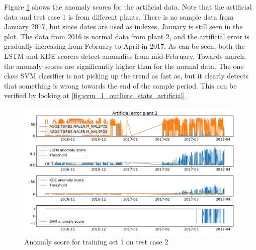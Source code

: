         Figure \ref{fig:anomaly_plant_1_train_artificial} shows the anomaly scores for the artificial data. Note that the artificial data and test case 1 is from different plants. There is no sample data from January 2017, but since dates are used as indexes, January is still seen in the plot. The data from 2016 is normal data from plant 2, and the artificial error is gradually increasing from February to April in 2017. As can be seen, both the LSTM and KDE scorers detect anomalies from mid-February. Towards march, the anomaly scores are significantly higher than for the normal data. The one class SVM classifier is not picking up the trend as fast as, but it clearly detects that something is wrong towards the end of the sample period. This can be verified by looking at \ref{fig:svm_1_outliers_stats_artificial}.      
        \begin{figure}
            \centering
            \includegraphics[width = \textwidth]{report/figures/analysis/plant1_training/artificial_data_anomaly.png}
            \caption{Anomaly score for training set 1 on test case 2}
            \label{fig:anomaly_plant_1_train_artificial}
        \end{figure}
    
